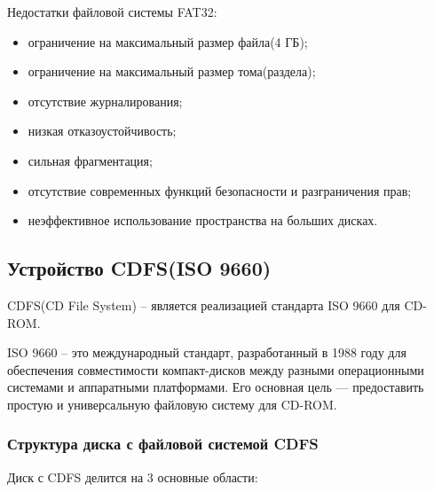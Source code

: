 Недостатки файловой системы FAT32:

\begin{itemize}
\item ограничение на максимальный размер файла(4 ГБ);
\item ограничение на максимальный размер тома(раздела);
\item отсутствие журналирования;
\item низкая отказоустойчивость;
\item сильная фрагментация;
\item отсутствие современных функций безопасности и разграничения прав;
\item неэффективное использование пространства на больших дисках.
\end{itemize}

\subsection{Устройство CDFS(ISO 9660)}

CDFS(CD File System) -- является реализацией стандарта ISO 9660 для CD-ROM.

ISO 9660 -- это международный стандарт, разработанный в 1988 году для обеспечения совместимости компакт-дисков между разными операционными системами и аппаратными платформами. Его основная цель — предоставить простую и универсальную файловую систему для CD-ROM.

\subsubsection{Структура диска с файловой системой CDFS}

Диск с CDFS делится на 3 основные области:


